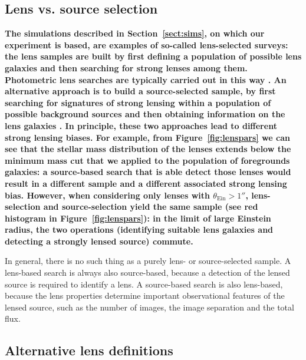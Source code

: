 \documentclass{aa}
\def\tein{\theta_{\mathrm{Ein}}}
\def\Sref#1{Section~\ref{#1}\xspace}
\def\Fref#1{Figure~\ref{#1}\xspace}
\begin{document}
\subsection{Lens vs. source selection}

{\bf
The simulations described in \Sref{sect:sims}, on which our experiment is based, are examples of so-called lens-selected surveys:
the lens samples are built by first defining a population of possible lens galaxies and then searching for strong lenses among them. Photometric lens searches are typically carried out in this way \citep[see e.g.][]{Gav++12,Son++18,Pet++19}.
An alternative approach is to build a source-selected sample, by first searching for signatures of strong lensing within a population of possible background sources and then obtaining information on the lens galaxies \citep[see e.g.][]{Hez++13}.
In principle, these two approaches lead to different strong lensing biases. %
For example, from \Fref{fig:lenspars} we can see that the stellar mass distribution of the lenses extends below the minimum mass cut that we applied to the population of foregrounds galaxies: a source-based search that is able detect those lenses would result in a different sample and a different associated strong lensing bias.
However, when considering only lenses with $\tein > 1''$, lens-selection and source-selection yield the same sample (see red histogram in \Fref{fig:lenspars}): in the limit of large Einstein radius, the two operations (identifying suitable lens galaxies and detecting a strongly lensed source) commute.

In general, there is no such thing as a purely lens- or source-selected sample. 
A lens-based search is always also source-based, because a detection of the lensed source is required to identify a lens.
A source-based search is also lens-based, because the lens properties determine important observational features of the lensed source, such as the number of images, the image separation and the total flux.
}

\subsection{Alternative lens definitions}
\end{document}
